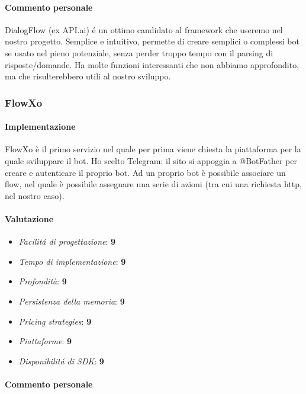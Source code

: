 \documentclass[]{article}
\begin{document}
\paragraph{Commento personale}
DialogFlow (ex API.ai) é un ottimo candidato al framework che useremo nel nostro progetto. Semplice e intuitivo, permette di creare semplici o complessi bot se usato nel pieno potenziale, senza perder troppo tempo con il parsing di risposte/domande. Ha molte funzioni interessanti che non abbiamo approfondito, ma che risulterebbero utili al nostro sviluppo. 

\subsubsection{FlowXo}
\paragraph{Implementazione}
FlowXo è il primo servizio nel quale per prima viene chiesta la piattaforma per la quale sviluppare il bot. Ho scelto Telegram: il sito si appoggia a @BotFather per creare e autenticare il proprio bot. Ad un proprio bot è possibile associare un flow, nel quale è possibile assegnare una serie di azioni (tra cui una richiesta http, nel nostro caso).
\paragraph{Valutazione}
\begin{itemize}
\item \textit{Facilitá di progettazione}: \textbf{9} \\
\item \textit{Tempo di implementazione}: \textbf{9} \\
\item \textit{Profondità}: \textbf{9} \\
\item \textit{Persistenza della memoria}: \textbf{9} \\
\item \textit{Pricing strategies}: \textbf{9} \\
\item \textit{Piattaforme}: \textbf{9} \\
\item \textit{Disponibilitá di SDK}: \textbf{9} \\
\end{itemize}
\paragraph{Commento personale}
\end{document}
